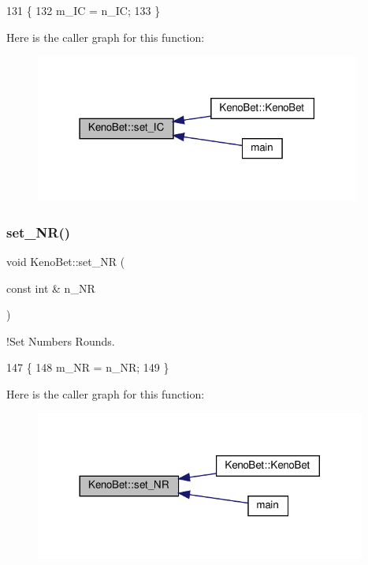 \begin{DoxyCode}
131 \{
132     m\_IC = n\_IC;
133 \}
\end{DoxyCode}
Here is the caller graph for this function\+:
\nopagebreak
\begin{figure}[H]
\begin{center}
\leavevmode
\includegraphics[width=303pt]{classKenoBet_a7b74641d226e6b2ea45bc60889f32781_icgraph}
\end{center}
\end{figure}
\mbox{\label{classKenoBet_a63780c5d19157760a2760407cd68149f}} 
\subsubsection{\texorpdfstring{set\+\_\+\+N\+R()}{set\_NR()}}
{\footnotesize\ttfamily void Keno\+Bet\+::set\+\_\+\+NR (\begin{DoxyParamCaption}\item[{const int \&}]{n\+\_\+\+NR }\end{DoxyParamCaption})}



!\+Set Numbers Rounds. 


\begin{DoxyCode}
147 \{
148     m\_NR = n\_NR;
149 \}
\end{DoxyCode}
Here is the caller graph for this function\+:
\nopagebreak
\begin{figure}[H]
\begin{center}
\leavevmode
\includegraphics[width=308pt]{classKenoBet_a63780c5d19157760a2760407cd68149f_icgraph}
\end{center}
\end{figure}
\mbox{\label{classKenoBet_a4865fd866acc1500bde749d8d15ddf16}} 
